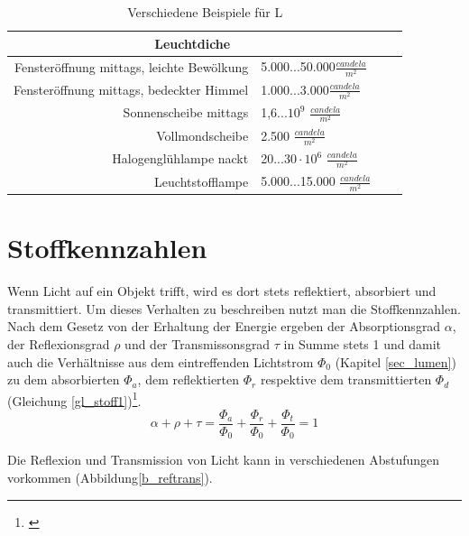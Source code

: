 \begin{table}[H] 
		\centering
		\begin{tabular}{rlcc}  %
		\toprule
		\multicolumn{2}{c}{\large\sffamily Leuchtdiche}\\ 							
		\midrule
		Fensteröffnung mittags, leichte Bewölkung & 5.000...50.000$\frac{candela}{m^{2}}$\\
		Fensteröffnung mittags, bedeckter Himmel & 1.000...3.000$\frac{candela}{m^{2}}$\\
		Sonnenscheibe mittags & 1,6...$10^{9}$ $\frac{candela}{m^{2}}$\\
		Vollmondscheibe & 2.500 $\frac{candela}{m^{2}}$\\
		Halogenglühlampe nackt & 20...$30 \cdot 10^{6}$ $\frac{candela}{m^{2}}$\\
		Leuchtstofflampe & 5.000...15.000 $\frac{candela}{m^{2}}$\\
		\bottomrule
		\end{tabular}
		\caption{Verschiedene Beispiele für L\protect\footnotemark}	
		\label{t_candelamm}
	\end{table}

\section{Stoffkennzahlen}
Wenn Licht auf ein Objekt trifft, wird es dort stets reflektiert, absorbiert und transmittiert. Um dieses Verhalten zu beschreiben nutzt man die Stoffkennzahlen. Nach dem Gesetz von der Erhaltung der Energie ergeben der Absorptionsgrad $\alpha$, der Reflexionsgrad $\rho$ und der Transmissonsgrad $\tau$ in Summe stets 1 und damit auch die Verhältnisse aus dem eintreffenden Lichtstrom $\Phi_{0}$ (Kapitel \ref{sec_lumen}) zu dem absorbierten $\Phi_{a}$, dem reflektierten $\Phi_{r}$ respektive dem transmittierten $\Phi_{d}$ (Gleichung \ref{gl_stoff1})\footnote{\cite[38]{hentschel}}.
\begin{equation}\label{gl_stoff1}
	\alpha + \rho + \tau = \frac{\Phi_{a}}{\Phi_{0}} + \frac{\Phi_{r}}{\Phi_{0}} + \frac{\Phi_{t}}{\Phi_{0}} = 1	
\end{equation}

\noindent Die Reflexion und Transmission von Licht kann in verschiedenen Abstufungen vorkommen (Abbildung\ref{b_reftrans}).

